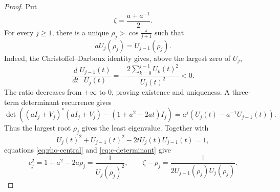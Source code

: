 \documentclass[a4paper,preprint,12pt,nopreprintline,sort&compress]{elsarticle}
\numberwithin{equation}{section}
\theoremstyle{remark}
\begin{document}
\begin{proof}
Put
\[
 \zeta=\frac{a+a^{-1}}2.
\]
For every \(j\geq1\), there is a unique
\(\rho_j>\cos\frac{\pi}{j+1}\) such that
\begin{equation}\label{eq:rho-central}
 aU_j(\rho_j)=U_{j-1}(\rho_j).
\end{equation}
Indeed, the Christoffel--Darboux identity gives, above the largest zero
of \(U_j\),
\[
 \frac{d}{dt}\frac{U_{j-1}(t)}{U_j(t)}
 =-\frac{2\sum_{k=0}^{j-1}U_k(t)^2}{U_j(t)^2}<0.
\]
The ratio decreases from \(+\infty\) to \(0\), proving existence and
uniqueness.  A three-term determinant recurrence gives
\begin{equation}\label{eq:c-determinant}
 \det\left((aI_j+V_j)^*(aI_j+V_j)
 -(1+a^2-2at)I_j\right)
 =a^j\left(U_j(t)-a^{-1}U_{j-1}(t)\right).
\end{equation}
Thus the largest root \(\rho_j\) gives the least eigenvalue.  Together
with
\[
 U_j(t)^2+U_{j-1}(t)^2-2tU_j(t)U_{j-1}(t)=1,
\]
equations \eqref{eq:rho-central} and \eqref{eq:c-determinant} give
\begin{equation}\label{eq:c-rho-identities}
 c_j^2=1+a^2-2a\rho_j=\frac1{U_j(\rho_j)^2},\qquad
 \zeta-\rho_j=\frac1{2U_{j-1}(\rho_j)U_j(\rho_j)}.
\end{equation}


\end{proof}
\end{document}
